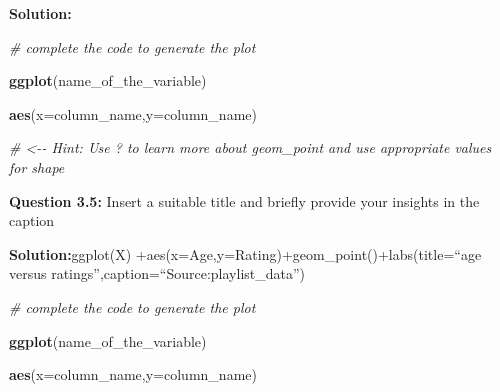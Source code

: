 \documentclass[
]{article}
\newenvironment{Shaded}{\begin{snugshade}}{\end{snugshade}}
\newcommand{\AttributeTok}[1]{\textcolor[rgb]{0.13,0.29,0.53}{#1}}
\newcommand{\CommentTok}[1]{\textcolor[rgb]{0.56,0.35,0.01}{\textit{#1}}}
\newcommand{\FunctionTok}[1]{\textcolor[rgb]{0.13,0.29,0.53}{\textbf{#1}}}
\newcommand{\NormalTok}[1]{#1}
\begin{document}
\textbf{Solution:}

\begin{Shaded}
\begin{Highlighting}[]
\CommentTok{\# complete the code to generate the plot}

\FunctionTok{ggplot}\NormalTok{(name\_of\_the\_variable) }

\FunctionTok{aes}\NormalTok{(}\AttributeTok{x=}\NormalTok{column\_name,}\AttributeTok{y=}\NormalTok{column\_name)}

 \CommentTok{\# \textless{}{-}{-} Hint: Use ? to learn more about geom\_point and use appropriate values for shape}
\end{Highlighting}
\end{Shaded}

\textbf{Question 3.5:} Insert a suitable title and briefly provide your
insights in the caption

\textbf{Solution:}ggplot(X)
+aes(x=Age,y=Rating)+geom\_point()+labs(title=``age versus
ratings'',caption=``Source:playlist\_data'')

\begin{Shaded}
\begin{Highlighting}[]
\CommentTok{\# complete the code to generate the plot}

\FunctionTok{ggplot}\NormalTok{(name\_of\_the\_variable) }

\FunctionTok{aes}\NormalTok{(}\AttributeTok{x=}\NormalTok{column\_name,}\AttributeTok{y=}\NormalTok{column\_name)}
\end{Highlighting}
\end{Shaded}
\end{document}
